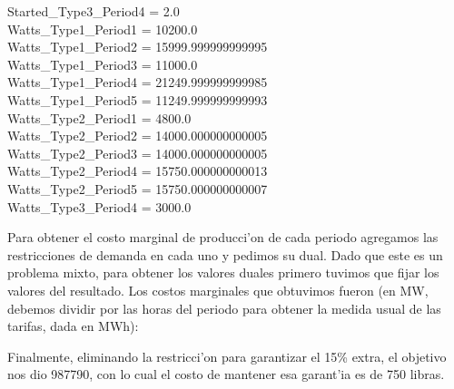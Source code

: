 \begin{Parallel}[v]{0.48\textwidth}{0.48\textwidth}
{%
Started\_Type3\_Period4 = 2.0\\
Watts\_Type1\_Period1 = 10200.0\\
Watts\_Type1\_Period2 = 15999.999999999995\\
Watts\_Type1\_Period3 = 11000.0\\
Watts\_Type1\_Period4 = 21249.999999999985\\
Watts\_Type1\_Period5 = 11249.999999999993\\
Watts\_Type2\_Period1 = 4800.0\\
Watts\_Type2\_Period2 = 14000.000000000005\\
Watts\_Type2\_Period3 = 14000.000000000005\\
Watts\_Type2\_Period4 = 15750.000000000013\\
Watts\_Type2\_Period5 = 15750.000000000007\\
Watts\_Type3\_Period4 = 3000.0\\
}
\end{Parallel}
Para obtener el costo marginal de producci'on de cada periodo agregamos las restricciones de demanda en cada uno y pedimos su dual. Dado que este es un problema mixto, para obtener los valores duales primero tuvimos que fijar los valores del resultado. Los costos marginales que obtuvimos fueron (en MW, debemos dividir por las horas del periodo para obtener la medida usual de las tarifas, dada en MWh): \\
\begin{Parallel}[v]{0.48\textwidth}{0.48\textwidth}
\end{Parallel}
Finalmente, eliminando la restricci'on para garantizar el 15\% extra, el objetivo nos dio 987790, con lo cual el costo de mantener esa garant'ia es de 750 libras.